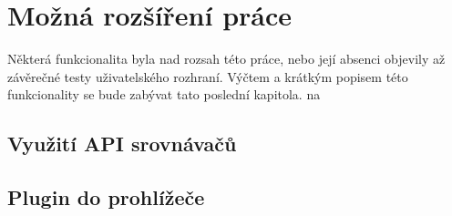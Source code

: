 \chapter{Možná rozšíření práce}
Některá funkcionalita byla nad rozsah této práce, nebo její absenci objevily až závěrečné testy uživatelského rozhraní. Výčtem a krátkým popisem této funkcionality se bude zabývat tato poslední kapitola.
 na

\section{Využití API srovnávačů}

\section{Plugin do prohlížeče}